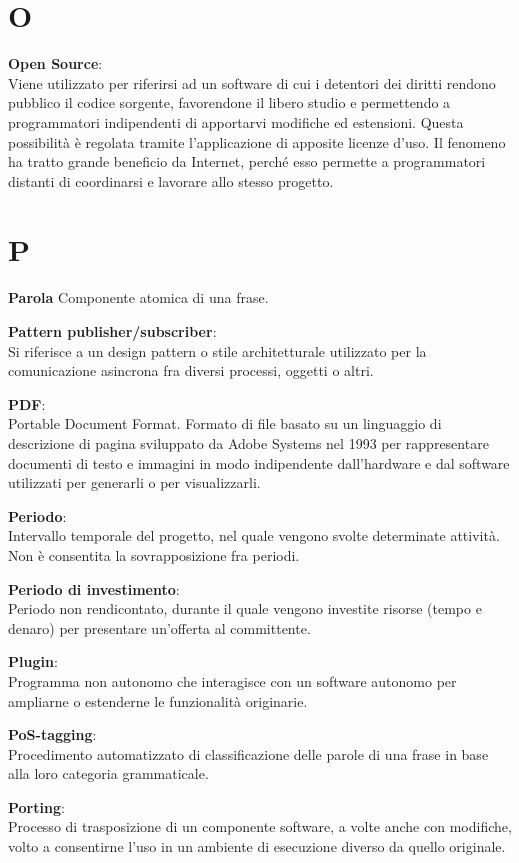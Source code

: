 \documentclass[a4paper, oneside, openany, dvipsnames, table]{article}
\begin{document}
\newpage
\section{O}
\textbf{Open Source}:\\	Viene utilizzato per riferirsi ad un software di cui i detentori dei diritti rendono pubblico il codice sorgente, favorendone il libero studio e permettendo a programmatori indipendenti di apportarvi modifiche ed estensioni. Questa possibilità è regolata tramite l'applicazione di apposite licenze d'uso. Il fenomeno ha tratto grande beneficio da Internet, perché esso permette a programmatori distanti di coordinarsi e lavorare allo stesso progetto.

\newpage
\section{P}
\textbf{Parola}
Componente atomica di una frase.

\textbf{Pattern publisher/subscriber}:\\	 Si riferisce a un design pattern o stile architetturale utilizzato per la comunicazione asincrona fra diversi processi, oggetti o altri.

\textbf{PDF}:\\	Portable Document Format. Formato di file basato su un linguaggio di descrizione di pagina sviluppato da Adobe Systems nel 1993 per rappresentare documenti di testo e immagini in modo indipendente dall'hardware e dal software utilizzati per generarli o per visualizzarli.

\textbf{Periodo}:\\	Intervallo temporale del progetto, nel quale vengono svolte determinate attività. Non è consentita la sovrapposizione fra periodi.

\textbf{Periodo di investimento}:\\	Periodo non rendicontato, durante il quale vengono investite risorse (tempo e denaro) per presentare un'offerta al committente.

\textbf{Plugin}:\\	Programma non autonomo che interagisce con un software autonomo per ampliarne o estenderne le funzionalità originarie.

\textbf{PoS-tagging}:\\	Procedimento automatizzato di classificazione delle parole di una frase in base alla loro categoria grammaticale.

\textbf{Porting}:\\	Processo di trasposizione di un componente software, a volte anche con modifiche, volto a consentirne l'uso in un ambiente di esecuzione diverso da quello originale.
\end{document}

